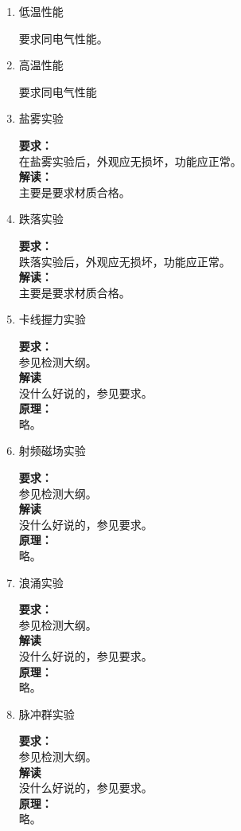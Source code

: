 \documentclass{article}
\begin{document}
\begin{CJK}{UTF8}{gbsn}
\begin{enumerate}
\item 低温性能
	\par
	要求同电气性能。
\item 高温性能
	\par
	要求同电气性能
\item 盐雾实验
	\par
	\textbf{要求：}\\
	在盐雾实验后，外观应无损坏，功能应正常。\\
	\textbf{解读：}\\
	主要是要求材质合格。
\item 跌落实验
	\par
	\textbf{要求：}\\
	跌落实验后，外观应无损坏，功能应正常。\\
	\textbf{解读：}\\
	主要是要求材质合格。
\item 卡线握力实验
	\par
	\textbf{要求：}\\
	参见检测大纲。\\
	\textbf{解读}\\
	没什么好说的，参见要求。\\
	\textbf{原理：}\\
	略。

\item 射频磁场实验
	\par
	\textbf{要求：}\\
	参见检测大纲。\\
	\textbf{解读}\\
	没什么好说的，参见要求。\\
	\textbf{原理：}\\
	略。

\item 浪涌实验
	\par
	\textbf{要求：}\\
	参见检测大纲。\\
	\textbf{解读}\\
	没什么好说的，参见要求。\\
	\textbf{原理：}\\
	略。

\item 脉冲群实验
	\par
	\textbf{要求：}\\
	参见检测大纲。\\
	\textbf{解读}\\
	没什么好说的，参见要求。\\
	\textbf{原理：}\\
	略。


\end{enumerate}
\end{CJK}
\end{document}
